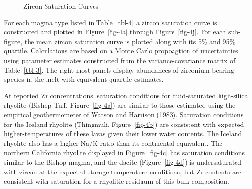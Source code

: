 \documentclass[
]{agujournal2019}
\begin{document}
\begin{figure}
\begin{minipage}{\linewidth}
{}


\end{minipage}%
\newline
\begin{minipage}{\linewidth}



\end{minipage}%

\caption{\label{fig-4}Zircon Saturation Curves}

\end{figure}%

For each magma type listed in Table~\ref{tbl-4} a zircon saturation
curve is constructed and plotted in Figure~\ref{fig-4a} through
Figure~\ref{fig-4j}. For each sub-figure, the mean zircon saturation
curve is plotted along with its 5\% and 95\% quartile. Calculations are
based on a Monte Carlo propoagtion of uncertainties using parameter
estimates constructed from the variance-covariance matrix of
Table~\ref{tbl-3}. The right-most panels display abundances of
zirconium-bearing species in the melt with equivalent quartile
estimates.

At reported Zr concentrations, saturation conditions for fluid-saturated
high-silica rhyolite (Bishop Tuff, Figure~\ref{fig-4a}) are similar to
those estimated using the empirical geothermometer of Watson and
Harrison (1983). Saturation conditions for the Iceland rhyolite
(Thingmuli, Figure~\ref{fig-4b}) are consistent with expected
higher-temperatures of these lavas given their lower water contents. The
Iceland rhyolite also has a higher Na/K ratio than its continental
equivalent. The northern California rhyolite displayed in
Figure~\ref{fig-4c} has saturation conditions similar to the Bishop
magma, and the dacite (Figure~\ref{fig-4d}) is undersaturated with
zircon at the expected storage temperature conditions, but Zr contents
are consistent with saturation for a rhyolitic residuum of this bulk
composition.
\end{document}
